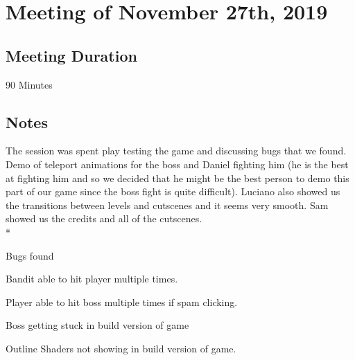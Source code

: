 \documentclass{article}
\begin{document}
\section{Meeting of November 27th, 2019}

\subsection{Meeting Duration}
90 Minutes

\subsection{Notes}

The session was spent play testing the game and discussing bugs that we found. Demo of teleport animations for the boss and Daniel fighting him (he is the best at fighting him and so we decided that he might be the best person to demo this part of our game since the boss fight is quite difficult). Luciano also showed us the transitions between levels and cutscenes and it seems very smooth. Sam showed us the credits and all of the cutscenes.\\*

Bugs found
\begin{description}
\item Bandit able to hit player multiple times.
\item Player able to hit boss multiple times if spam clicking.
\item Boss getting stuck in build version of game
\item Outline Shaders not showing in build version of game.
\end{description}
\end{document}
